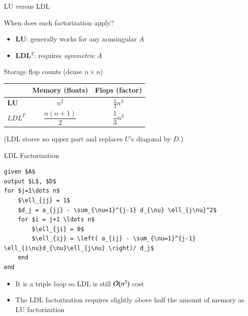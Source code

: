 \documentclass[10pt]{beamer}
\begin{document}
\begin{frame}{LU versus LDL}


\begin{block}{When does each factorization apply?}
\begin{itemize}
  \item \textbf{LU}: \;generally works for any nonsingular $A$ 
  \item \textbf{LDL$^{T}$}: \;requires \emph{symmetric} $A$
\end{itemize}
\end{block}

\vspace{2mm}
\begin{block}{Storage flop counts (dense $n\times n$)}
\begin{center}
\begin{tabular}{lcc}
                & Memory (floats) & Flops (factor) \\ \hline
\textbf{LU}              & $n^2$ & $\tfrac23 n^{3}$ \\
$LDL^T$ & $\dfrac{n(n+1)}{2}$ & $\dfrac{1}{3}n^3$\end{tabular}
\end{center}
\vspace{-2mm}
\footnotesize (LDL stores no upper part and replaces $U$’s diagonal by $D$.) 
\end{block}

\end{frame}
\begin{frame}[fragile]{ LDL Factorization}

\begin{lstlisting}[mathescape,caption=$LDL'$ Factorization,label=algo:symm]
given $A$
output $L$, $D$
for $j=1\dots n$          
    $\ell_{jj} = 1$
    $d_j = a_{jj} - \sum_{\nu=1}^{j-1} d_{\nu} \ell_{j\nu}^2$
    for $i = j+1 \ldots n$      
        $\ell_{ji} = 0$
        $\ell_{ij} = \left( a_{ij} - \sum_{\nu=1}^{j-1} \ell_{i\nu}d_{\nu}\ell_{j\nu} \right)/ d_j$
    end
end                          
\end{lstlisting}
\begin{itemize}
    \item It is a triple loop so LDL is still ${\mathcal{O}}(n^3)$ cost
    \item The LDL factorization requires slightly above half the amount of memory as LU factorization
\end{itemize}
\end{frame}
\end{document}
